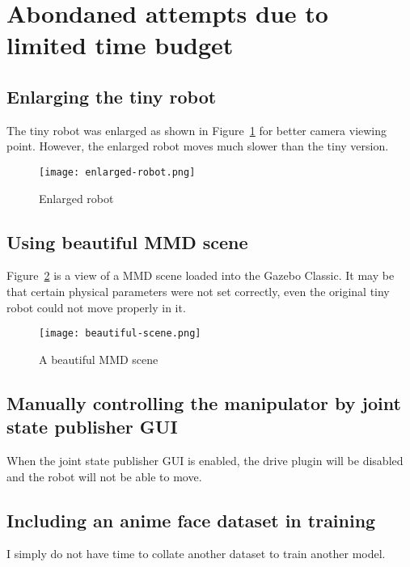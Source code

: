 \section{Abondaned attempts due to limited time budget}

\subsection{Enlarging the tiny robot}

The tiny robot was enlarged as shown in Figure~\ref{fig:enlarged-robot} for better camera viewing point. However, the enlarged robot moves much slower than the tiny version.

\begin{figure}[htbp]
   \centering
   \texttt{[image: enlarged-robot.png]}
   \caption{Enlarged robot}
   \label{fig:enlarged-robot}
\end{figure}


\subsection{Using beautiful MMD scene}

Figure~\ref{fig:beautiful-scene} is a view of a MMD scene loaded into the Gazebo Classic. It may be that certain physical parameters were not set correctly, even the original tiny robot could not move properly in it.

\begin{figure}[htbp]
   \centering
   \texttt{[image: beautiful-scene.png]}
   \caption{A beautiful MMD scene}
   \label{fig:beautiful-scene}
\end{figure}


\subsection{Manually controlling the manipulator by joint state publisher GUI}

When the joint state publisher GUI is enabled, the drive plugin will be disabled and the robot will not be able to move.


\subsection{Including an anime face dataset in training}

I simply do not have time to collate another dataset to train another model.


